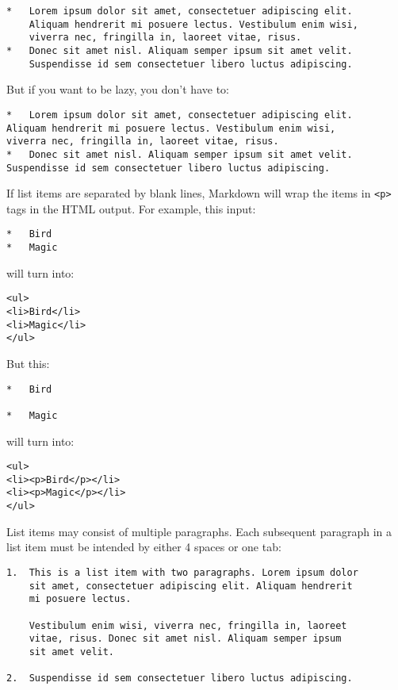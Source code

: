 \begin{lstlisting}
*   Lorem ipsum dolor sit amet, consectetuer adipiscing elit.
    Aliquam hendrerit mi posuere lectus. Vestibulum enim wisi,
    viverra nec, fringilla in, laoreet vitae, risus.
*   Donec sit amet nisl. Aliquam semper ipsum sit amet velit.
    Suspendisse id sem consectetuer libero luctus adipiscing.
\end{lstlisting}




But if you want to be lazy, you don't have to:

\begin{lstlisting}
*   Lorem ipsum dolor sit amet, consectetuer adipiscing elit.
Aliquam hendrerit mi posuere lectus. Vestibulum enim wisi,
viverra nec, fringilla in, laoreet vitae, risus.
*   Donec sit amet nisl. Aliquam semper ipsum sit amet velit.
Suspendisse id sem consectetuer libero luctus adipiscing.
\end{lstlisting}




If list items are separated by blank lines, Markdown will wrap the
items in \texttt{<p>} tags in the HTML output. For example, this input:

\begin{lstlisting}
*   Bird
*   Magic
\end{lstlisting}




will turn into:

\begin{lstlisting}
<ul>
<li>Bird</li>
<li>Magic</li>
</ul>
\end{lstlisting}




But this:

\begin{lstlisting}
*   Bird

*   Magic
\end{lstlisting}




will turn into:

\begin{lstlisting}
<ul>
<li><p>Bird</p></li>
<li><p>Magic</p></li>
</ul>
\end{lstlisting}




List items may consist of multiple paragraphs. Each subsequent
paragraph in a list item must be intended by either 4 spaces
or one tab:

\begin{lstlisting}
1.  This is a list item with two paragraphs. Lorem ipsum dolor
    sit amet, consectetuer adipiscing elit. Aliquam hendrerit
    mi posuere lectus.

    Vestibulum enim wisi, viverra nec, fringilla in, laoreet
    vitae, risus. Donec sit amet nisl. Aliquam semper ipsum
    sit amet velit.

2.  Suspendisse id sem consectetuer libero luctus adipiscing.
\end{lstlisting}





